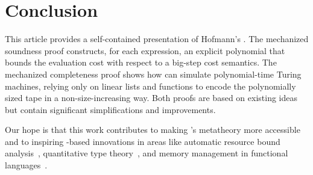 \section{Conclusion}

This article provides a self-contained presentation of Hofmann's \lfpl.
%
The mechanized soundness proof constructs, for each \lfpl expression,
an explicit polynomial that bounds the evaluation cost with respect to
a big-step cost semantics.
%
The mechanized completeness proof shows how \lfpl can simulate
polynomial-time Turing machines, relying only on linear lists and
functions to encode the polynomially sized tape in a non-size-increasing
way.
%
Both proofs are based on existing ideas but contain significant
simplifications and improvements.

Our hope is that this work contributes to making \lfpl's metatheory
more accessible and to inspiring \lfpl-based innovations in areas like
automatic resource bound analysis~\cite{HoffmJ22}, quantitative type
theory~\cite{atkeyPolynomialTimeDependent2024}, and memory management
in functional languages~\cite{lorenzenFP2FullyInPlace2023}.
